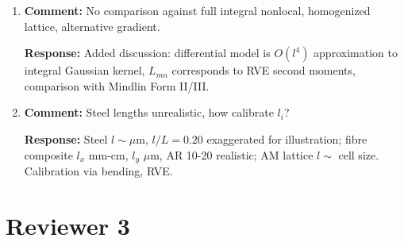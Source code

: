 \documentclass[12pt,a4paper]{article}
\begin{document}
\begin{enumerate}[leftmargin=14pt, itemsep=10pt]
\item \textbf{Comment:} No comparison against full integral nonlocal, homogenized lattice, alternative gradient.

\textbf{Response:} Added discussion: differential model is $O(l^4)$ approximation to integral Gaussian kernel, $L_{mn}$ corresponds to RVE second moments, comparison with Mindlin Form II/III.

\item \textbf{Comment:} Steel lengths unrealistic, how calibrate $l_i$?

\textbf{Response:} Steel $l\sim\mu$m, $l/L=0.20$ exaggerated for illustration; fibre composite $l_x$ mm-cm, $l_y$ $\mu$m, AR 10-20 realistic; AM lattice $l\sim$ cell size. Calibration via bending, RVE.

\end{enumerate}

\section*{Reviewer 3}
\end{document}
